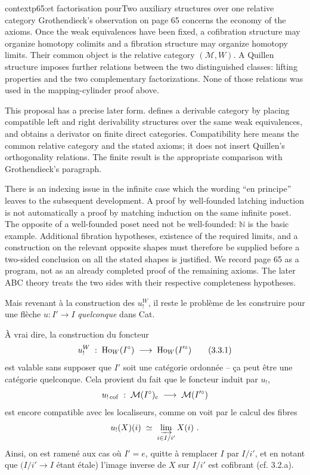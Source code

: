 \begin{dcomment}{context}{p65:et factorisation pour}{Two auxiliary structures over one relative category}
Grothendieck's observation on page 65 concerns the economy of the axioms. Once the weak equivalences have been fixed, a cofibration structure may organize homotopy colimits and a fibration structure may organize homotopy limits. Their common object is the relative category $(\mathcal M,W)$. A Quillen structure imposes further relations between the two distinguished classes: lifting properties and the two complementary factorizations. None of those relations was used in the mapping-cylinder proof above.

This proposal has a precise later form. \citet[Definition 2.25 and Corollary 2.28]{Cisinski2010} defines a derivable category by placing compatible left and right derivability structures over the same weak equivalences, and obtains a derivator on finite direct categories. Compatibility here means the common relative category and the stated axioms; it does not insert Quillen's orthogonality relations. The finite result is the appropriate comparison with Grothendieck's paragraph.

There is an indexing issue in the infinite case which the wording ``en principe'' leaves to the subsequent development. A proof by well-founded latching induction is not automatically a proof by matching induction on the same infinite poset. The opposite of a well-founded poset need not be well-founded: $\mathbb N$ is the basic example. Additional fibration hypotheses, existence of the required limits, and a construction on the relevant opposite shapes must therefore be supplied before a two-sided conclusion on all the stated shapes is justified. We record page 65 as a program, not as an already completed proof of the remaining axioms. The later ABC theory treats the two sides with their respective completeness hypotheses.
\end{dcomment}


Mais revenant à la construction des $u_!^W$, il reste le problème de les construire pour une flèche $u : I'\longrightarrow I$ \textit{quelconque} dans Cat. %

À vrai dire, la construction du foncteur
\[
u_!^W \;:\; \Ho_W(I^\circ) \;\longrightarrow\; \Ho_W(I'^\circ) \tag*{(3.3.1)}
\]
est valable sans supposer que $I'$ soit une catégorie ordonnée – ça peut être une catégorie quelconque. Cela provient du fait que le foncteur induit par $u_!$,
\[
u_{!\,\mathrm{cof}} \;:\; \mathcal{M}(I^\circ)_{\mathrm{c}} \;\longrightarrow\; \mathcal{M}(I'^\circ)
\]
est encore compatible avec les localiseurs, comme on voit par le calcul des fibres
\[
u_!(X)(i) \;\simeq\; \varinjlim_{i\in I/i'} X(i)\ . %
\]
Ainsi, on est ramené aux cas où $I' = e$, quitte à remplacer $I$ par $I/i'$, et en notant que %
$(I/i'\longrightarrow I$ étant étale) l'image inverse de $X$ sur $I/i'$ est cofibrant (cf. 3.2.a). %

